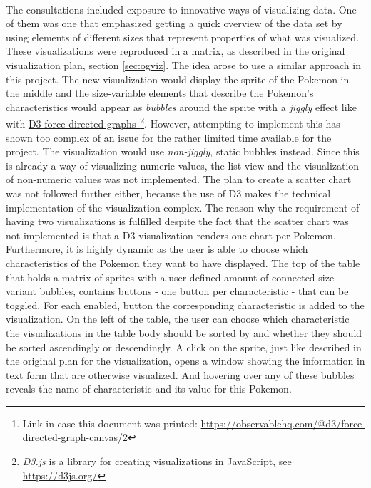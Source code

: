 \documentclass[12pt, a4paper]{article}
\begin{document}
			\paragraph{}
				The consultations included exposure to innovative ways of visualizing data. One of them was one that emphasized getting a quick overview of the data set by using elements of different sizes that represent properties of what was visualized. These visualizations were reproduced in a matrix, as described in the original visualization plan, section \ref{sec:ogviz}. The idea arose to use a similar approach in this project. The new visualization would display the sprite of the Pokemon in the middle and the size-variable elements that describe the Pokemon's characteristics would appear as \textit{bubbles} around the sprite with a \textit{jiggly} effect like with \href{https://observablehq.com/@d3/force-directed-graph-canvas/2}{D3 force-directed graphs}\footnote{Link in case this document was printed: \href{https://observablehq.com/@d3/force-directed-graph-canvas/2}{https://observablehq.com/@d3/force-directed-graph-canvas/2}}\footnote{\textit{D3.js} is a library for creating visualizations in JavaScript, see \href{https://d3js.org/}{https://d3js.org/}}. However, attempting to implement this has shown too complex of an issue for the rather limited time available for the project. The visualization would use \textit{non-jiggly}, static bubbles instead. Since this is already a way of visualizing numeric values, the list view and the visualization of non-numeric values was not implemented. The plan to create a scatter chart was not followed further either, because the use of D3 makes the technical implementation of the visualization complex. The reason why the requirement of having two visualizations is fulfilled despite the fact that the scatter chart was not implemented is that a D3 visualization renders one chart per Pokemon. Furthermore, it is highly dynamic as the user is able to choose which characteristics of the Pokemon they want to have displayed. The top of the table that holds a matrix of sprites with a user-defined amount of connected size-variant bubbles, contains buttons - one button per characteristic - that can be toggled. For each enabled, button the corresponding characteristic is added to the visualization. On the left of the table, the user can choose which characteristic the visualizations in the table body should be sorted by and whether they should be sorted ascendingly or descendingly. A click on the sprite, just like described in the original plan for the visualization, opens a window showing the information in text form that are otherwise visualized. And hovering over any of these bubbles reveals the name of characteristic and its value for this Pokemon.
\end{document}

